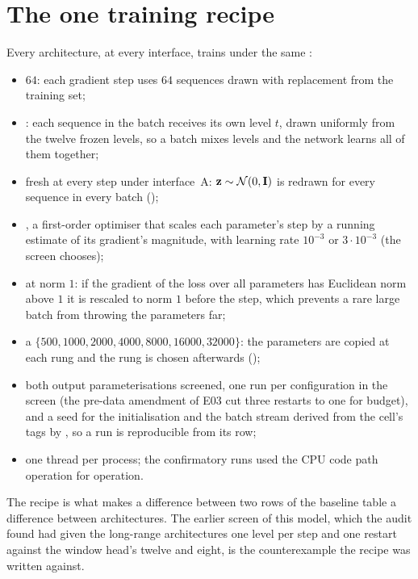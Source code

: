 \section{The one training recipe}
\label{sec:recipe}

Every architecture, at every interface, trains under the same :
\begin{itemize}
\item {} $64$: each gradient step uses $64$ sequences drawn with replacement
  from the training set;
\item {}: each sequence in the batch receives its own level $t$,
  drawn uniformly from the twelve frozen levels, so a batch mixes levels and the
  network learns all of them together;
\item fresh  at every step under interface~A: $\mathbf{z}\sim\mathcal{N}\!\left(0,\mathbf{I}\right)$ is
  redrawn for every sequence in every batch ();
\item {}, a first-order optimiser that scales each parameter's step by a
  running estimate of its gradient's magnitude, with learning rate $10^{-3}$ or
  $3\cdot10^{-3}$ (the screen chooses);
\item {} at norm $1$: if the gradient of the loss over all
  parameters has Euclidean norm above $1$ it is rescaled to norm $1$ before the step,
  which prevents a rare large batch from throwing the parameters far;
\item a  $\{500,1000,2000,4000,8000,16000,32000\}$: the parameters
  are copied at each rung and the rung is chosen afterwards ();
\item both output parameterisations screened, one run per configuration in the screen
  (the pre-data amendment of E03 cut three restarts to one for budget), and a seed for
  the initialisation and the batch stream derived from the cell's tags by
  , so a run is reproducible from its row;
\item one thread per process; the confirmatory runs used the CPU code path
  operation for operation.
\end{itemize}
The recipe is what makes a difference between two rows of the baseline table a
difference between architectures. The earlier screen of this model, which the audit
found had given the long-range architectures one level per step and one restart against
the window head's twelve and eight, is the counterexample the recipe was written against.

